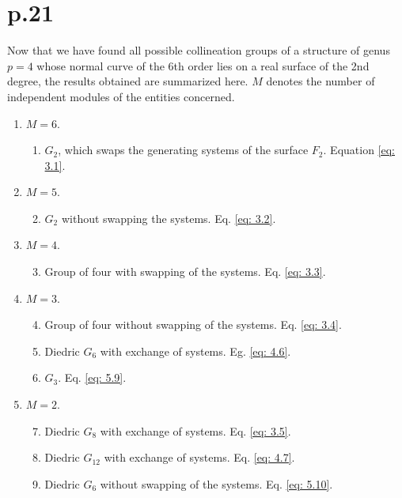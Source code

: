 \documentclass[leqno]{article}
\begin{document}
\section{p.21}
Now that we have found all possible collineation groups of a structure of genus $p=4$ whose normal curve of the 6th order lies on a real surface of the 2nd degree, the results obtained are summarized here. $M$ denotes the number of independent modules of the entities concerned. 
\begin{enumerate}[label=\alph*.]
	\item $M=6$.
	\begin{enumerate}[label=\arabic*)]
		\item $G_2$, which swaps the generating systems of the surface $F_2$. Equation \eqref{eq: 3.1}.
	\end{enumerate}
    \item $M=5$.
    \begin{enumerate}[label=\arabic*)]
    	\setcounter{enumii}{1}
    	\item $G_2$ without swapping the systems. Eq. \eqref{eq: 3.2}.
    \end{enumerate}
    \item $M=4$.
    \begin{enumerate}[label=\arabic*)]
    	\setcounter{enumii}{2}
    	\item Group of four with swapping of the systems. Eq. \eqref{eq: 3.3}.
    \end{enumerate}
    \item $M=3$.
    \begin{enumerate}[label=\arabic*)]
    	\setcounter{enumii}{3}
    	\item Group of four without swapping of the systems. Eq. \eqref{eq: 3.4}.
    	\item Diedric $G_6$ with exchange of systems. Eg. \eqref{eq: 4.6}. 
    	\item $G_3$. Eq. \eqref{eq: 5.9}.
    \end{enumerate}
    \item $M=2$.
    \begin{enumerate}[label=\arabic*)]
    	\setcounter{enumii}{6}
    	\item Diedric $G_8$ with exchange of systems. Eq. \eqref{eq: 3.5}.
    	\item Diedric $G_{12}$ with exchange of systems. Eq. \eqref{eq: 4.7}.  
    	\item Diedric $G_6$ without swapping of the systems. Eq. \eqref{eq: 5.10}.
    \end{enumerate}

\end{enumerate}
\end{document}
